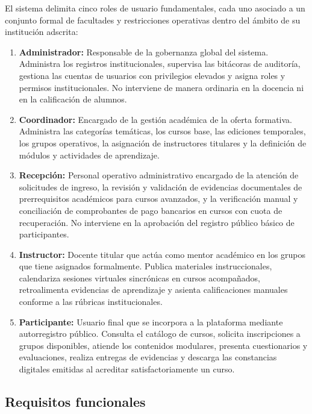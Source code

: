 El sistema delimita cinco roles de usuario fundamentales, cada uno asociado a un conjunto formal de facultades y restricciones operativas dentro del ámbito de su institución adscrita:

\begin{enumerate}
    \item \textbf{Administrador:} Responsable de la gobernanza global del sistema. Administra los registros institucionales, supervisa las bitácoras de auditoría, gestiona las cuentas de usuarios con privilegios elevados y asigna roles y permisos institucionales. No interviene de manera ordinaria en la docencia ni en la calificación de alumnos.
    \item \textbf{Coordinador:} Encargado de la gestión académica de la oferta formativa. Administra las categorías temáticas, los cursos base, las ediciones temporales, los grupos operativos, la asignación de instructores titulares y la definición de módulos y actividades de aprendizaje.
    \item \textbf{Recepción:} Personal operativo administrativo encargado de la atención de solicitudes de ingreso, la revisión y validación de evidencias documentales de prerrequisitos académicos para cursos avanzados, y la verificación manual y conciliación de comprobantes de pago bancarios en cursos con cuota de recuperación. No interviene en la aprobación del registro público básico de participantes.
    \item \textbf{Instructor:} Docente titular que actúa como mentor académico en los grupos que tiene asignados formalmente. Publica materiales instruccionales, calendariza sesiones virtuales sincrónicas en cursos acompañados, retroalimenta evidencias de aprendizaje y asienta calificaciones manuales conforme a las rúbricas institucionales.
    \item \textbf{Participante:} Usuario final que se incorpora a la plataforma mediante autorregistro público. Consulta el catálogo de cursos, solicita inscripciones a grupos disponibles, atiende los contenidos modulares, presenta cuestionarios y evaluaciones, realiza entregas de evidencias y descarga las constancias digitales emitidas al acreditar satisfactoriamente un curso.
\end{enumerate}

\subsection{Requisitos funcionales}
\label{sec:requisitos_funcionales}

